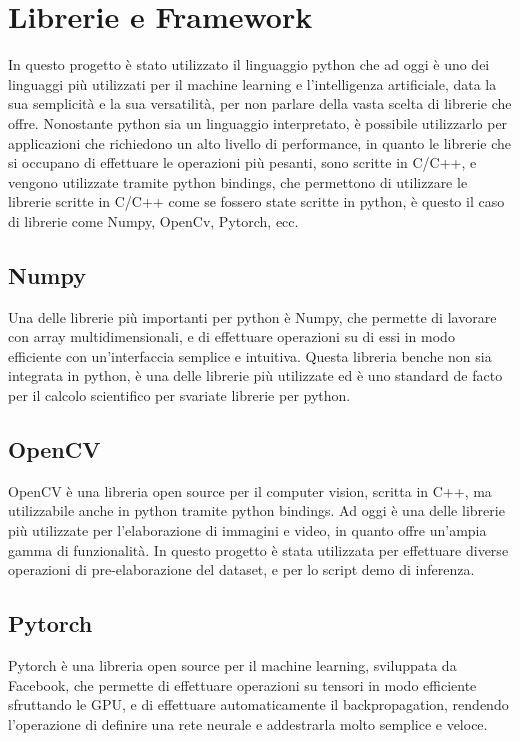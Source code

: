 \section{Librerie e Framework\ok}

In questo progetto è stato utilizzato il linguaggio python che ad oggi è uno dei linguaggi più utilizzati per il machine learning e l'intelligenza artificiale,
data la sua semplicità e la sua versatilità, per non parlare della vasta scelta di librerie che offre.
Nonostante python sia un linguaggio interpretato, è possibile utilizzarlo per applicazioni che richiedono un alto livello di performance,
in quanto le librerie che si occupano di effettuare le operazioni più pesanti, sono scritte in C/C++, e vengono 
utilizzate tramite python bindings, che permettono di utilizzare le librerie scritte in C/C++ come se fossero state scritte in python,
è questo il caso di librerie come Numpy, OpenCv, Pytorch, ecc.

\subsection{Numpy\ok}
Una delle librerie più importanti per python è Numpy, che permette di lavorare con array multidimensionali, e di effettuare operazioni su di essi 
in modo efficiente con un'interfaccia semplice e intuitiva. Questa libreria benche non sia integrata in python, è una delle librerie più utilizzate
ed è uno standard de facto per il calcolo scientifico per svariate librerie per python.

\subsection{OpenCV\ok}
OpenCV è una libreria open source per il computer vision, scritta in C++, ma utilizzabile anche in python tramite python bindings.
Ad oggi è una delle librerie più utilizzate per l'elaborazione di immagini e video, in quanto offre un'ampia gamma di funzionalità.
In questo progetto è stata utilizzata per effettuare diverse operazioni di pre-elaborazione del dataset, e per lo script demo di inferenza.

\subsection{Pytorch\ok}
Pytorch è una libreria open source per il machine learning, sviluppata da Facebook, che permette di effettuare operazioni su tensori in modo efficiente
sfruttando le GPU, e di effettuare automaticamente il backpropagation, rendendo l'operazione di definire una rete neurale e addestrarla
molto semplice e veloce.
